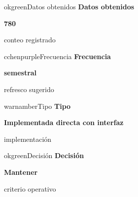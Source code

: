 \documentclass[9pt,a4paper]{extarticle}
\begin{document}
\vspace{0.04cm}
\begin{minipage}{0.24\textwidth}
\begin{metricbox}{okgreen}{Datos obtenidos}
{\large\bfseries Datos obtenidos}\par
{\Large\bfseries 780}\par
{\normalsize conteo registrado}
\end{metricbox}
\end{minipage}\hfill
\begin{minipage}{0.24\textwidth}
\begin{metricbox}{cchenpurple}{Frecuencia}
{\large\bfseries Frecuencia}\par
{\large\bfseries semestral}\par
{\normalsize refresco sugerido}
\end{metricbox}
\end{minipage}\hfill
\begin{minipage}{0.24\textwidth}
\begin{metricbox}{warnamber}{Tipo}
{\large\bfseries Tipo}\par
{\normalsize\bfseries Implementada directa con interfaz}\par
{\normalsize implementación}
\end{metricbox}
\end{minipage}\hfill
\begin{minipage}{0.24\textwidth}
\begin{metricbox}{okgreen}{Decisión}
{\large\bfseries Decisión}\par
{\normalsize\bfseries Mantener}\par
{\normalsize criterio operativo}
\end{metricbox}
\end{minipage}
\end{document}
